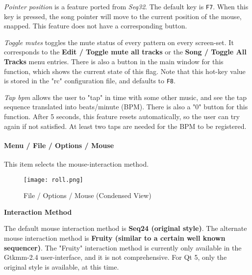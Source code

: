    \textsl{Pointer position} is a feature ported from \textsl{Seq32}.
   The default key is \texttt{F7}.
   When this key is pressed, the song pointer will move to the
   current position of the mouse, snapped.
   This feature does not have a corresponding button.

   \textsl{Toggle mutes} toggles the mute status of every
   pattern on every screen-set.  It corresponds to the
   \textbf{Edit / Toggle mute all tracks} or the 
   \textbf{Song / Toggle All Tracks}
   menu entries.  There is also a button in the main window for this function,
   which shows the current state of this flag.  Note that this
   hot-key value is stored in the "rc" configuration file, and
   defaults to \texttt{F8}.

   \textsl{Tap bpm} allows the user to "tap" in time with some
   other music, and see the tap sequence translated into beats/minute (BPM).
   There is also a "0" button for this function.
   After 5 seconds, this feature resets automatically, so the user can try
   again if not satisfied.  At least two taps are needed for the
   BPM to be registered.

%

\paragraph{Menu / File / Options / Mouse }
\label{paragraph:seq66_menu_file_options_mouse}

   This item selects the mouse-interaction method.

\begin{figure}[H]
   \centering 
   \texttt{[image: roll.png]}
   \caption{File / Options / Mouse (Condensed View)}
   \label{fig:seq66_menu_file_options_mouse}
\end{figure}

   \textbf{Interaction Method}

   The default mouse interaction method is \textbf{Seq24 (original style)}.
   The alternate mouse interaction method is \textbf{Fruity (similar to a
   certain well known sequencer)}.
   The "Fruity" interaction method
   is currently only available in the Gtkmm-2.4 user-interface, and it
   is not comprehensive.
   For Qt 5, only the original style is available, at this time.

